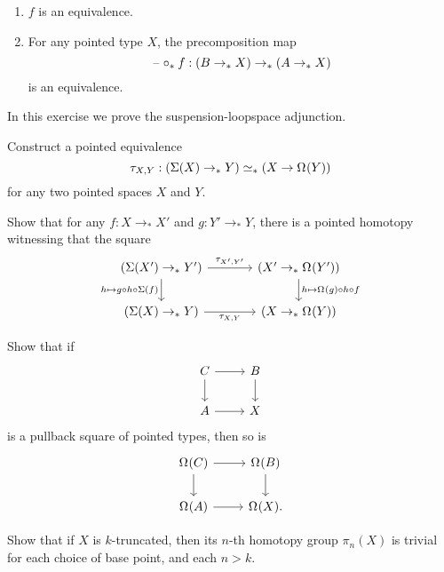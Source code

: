 \begin{exercises}
\begin{enumerate}
\item $f$ is an equivalence.
\item For any pointed type $X$, the precomposition map
\begin{equation*}
\mathord{\hspace{1pt}\text{--}\hspace{1pt}}\mathbin{\circ_\ast}f:(B\to_\ast X)\to_\ast (A\to_\ast X)
\end{equation*}
is an equivalence. 
\end{enumerate}
\item In this exercise we prove the suspension-loopspace adjunction.
\begin{subexenum}
\item Construct a pointed equivalence
\begin{equation*}
\tau_{X,Y}:(\Sigma(X)\to_\ast Y) \simeq_\ast (X\to \Omega^{}(Y))
\end{equation*}
for any two pointed spaces $X$ and $Y$.
\item Show that for any $f:X\to_\ast X'$ and $g:Y'\to_\ast Y$, there is a pointed homotopy witnessing that the square
\begin{equation*}
\begin{tikzcd}[column sep=large]
(\susp(X')\to_\ast Y') \arrow[r,"\tau_{X',Y'}"] \arrow[d,swap,"h\mapsto g\circ h\circ \susp(f)"] & (X'\to_\ast \loopspace{Y'}) \arrow[d,"h\mapsto\loopspace{g}\circ h\circ f"] \\
(\susp(X)\to_\ast Y) \arrow[r,swap,"\tau_{X,Y}"] & (X\to_\ast \loopspace{Y})
\end{tikzcd}
\end{equation*}
\end{subexenum}
\item Show that if
\begin{equation*}
\begin{tikzcd}
C \arrow[r] \arrow[d] & B \arrow[d] \\
A \arrow[r] & X
\end{tikzcd}
\end{equation*}
is a pullback square of pointed types, then so is
\begin{equation*}
\begin{tikzcd}
\loopspace{C} \arrow[r] \arrow[d] & \loopspace{B} \arrow[d] \\
\loopspace{A} \arrow[r] & \loopspace{X}.
\end{tikzcd}
\end{equation*}
\item 
\begin{subexenum}
\item Show that if $X$ is $k$-truncated, then its $n$-th homotopy group $\pi_n(X)$ is trivial for each choice of base point, and each $n> k$.

\end{subexenum}
\end{exercises}
